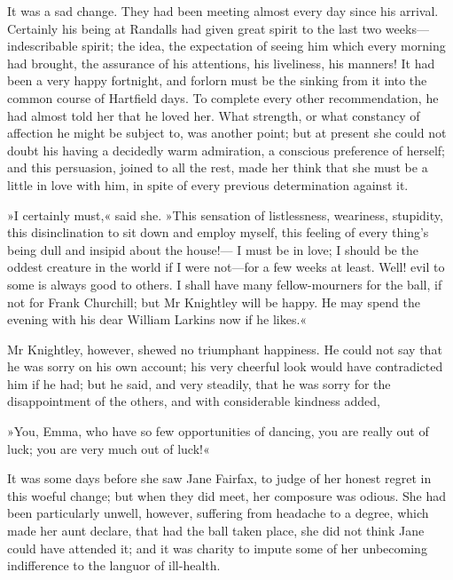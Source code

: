 It was a sad change. They had been meeting almost every day since his arrival. Certainly his being at Randalls had given great spirit to the last two weeks—indescribable spirit; the idea, the expectation of seeing him which every morning had brought, the assurance of his attentions, his liveliness, his manners! It had been a very happy fortnight, and forlorn must be the sinking from it into the common course of Hartfield days. To complete every other recommendation, he had almost told her that he loved her. What strength, or what constancy of affection he might be subject to, was another point; but at present she could not doubt his having a decidedly warm admiration, a conscious preference of herself; and this persuasion, joined to all the rest, made her think that she must be a little in love with him, in spite of every previous determination against it.

»I certainly must,« said she. »This sensation of listlessness, weariness, stupidity, this disinclination to sit down and employ myself, this feeling of every thing's being dull and insipid about the house!— I must be in love; I should be the oddest creature in the world if I were not—for a few weeks at least. Well! evil to some is always good to others. I shall have many fellow-mourners for the ball, if not for Frank Churchill; but Mr Knightley will be happy. He may spend the evening with his dear William Larkins now if he likes.«

Mr Knightley, however, shewed no triumphant happiness. He could not say that he was sorry on his own account; his very cheerful look would have contradicted him if he had; but he said, and very steadily, that he was sorry for the disappointment of the others, and with considerable kindness added,

»You, Emma, who have so few opportunities of dancing, you are really out of luck; you are very much out of luck!«

It was some days before she saw Jane Fairfax, to judge of her honest regret in this woeful change; but when they did meet, her composure was odious. She had been particularly unwell, however, suffering from headache to a degree, which made her aunt declare, that had the ball taken place, she did not think Jane could have attended it; and it was charity to impute some of her unbecoming indifference to the languor of ill-health.


